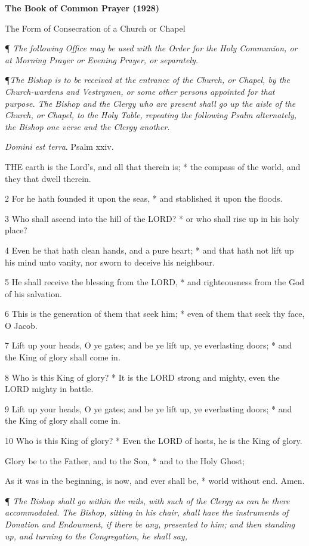 
\textbf{The Book of Common Prayer (1928)}

The
Form of Consecration of a Church or Chapel

¶
\emph{The following Office may be used with the Order for the Holy Communion,
or at Morning Prayer or Evening Prayer, or separately.}

¶\emph{The Bishop is to be received at the entrance of the Church,
or Chapel, by the Church-wardens and Vestrymen, or some other persons
appointed for that purpose. The Bishop and the Clergy who are present
shall go up the aisle of the Church, or Chapel, to the Holy Table, repeating
the following Psalm alternately, the Bishop one verse and the Clergy another.}

\emph{Domini
est terra}. Psalm xxiv.

THE
earth is the Lord’s, and all that therein is; * the compass of the
world, and they that dwell therein.

2 For he hath founded it upon the seas, * and stablished
it upon the floods.

3 Who shall ascend into the hill of the LORD?
* or who shall rise up in his holy place?

4 Even he that hath clean hands, and a pure heart;
* and that hath not lift up his mind unto vanity, nor sworn to deceive
his neighbour.

5 He shall receive the blessing from the LORD,
* and righteousness from the God of his salvation.

6 This is the generation of them that seek him; * even
of them that seek thy face, O Jacob.

7 Lift up your heads, O ye gates; and be ye lift up,
ye everlasting doors; * and the King of glory shall come in.

8 Who is this King of glory? * It is the LORD
strong and mighty, even the LORD mighty in battle.

9 Lift up your heads, O ye gates; and be ye lift up,
ye everlasting doors; * and the King of glory shall come in.

10 Who is this King of glory? * Even the LORD
of hosts, he is the King of glory. 

Glory be to the Father, and to the Son, * and to the
Holy Ghost;

As it was in the beginning, is now, and ever shall
be, * world without end. Amen.

¶
\emph{The Bishop shall go within the rails, with such of the Clergy as can
be there accommodated. The Bishop, sitting in his chair, shall have the
instruments of Donation and Endowment, if there be any, presented to him;
and then standing up, and turning to the Congregation, he shall say,}

